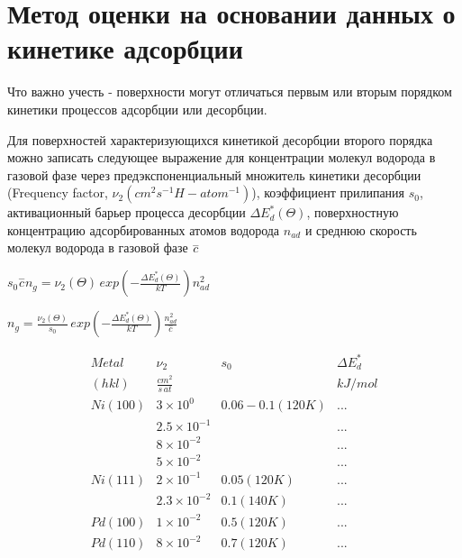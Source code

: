 \documentclass[11pt]{article}
\begin{document}
    

    \section{Метод оценки на основании данных о кинетике
адсорбции}\label{ux43cux435ux442ux43eux434-ux43eux446ux435ux43dux43aux438-ux43dux430-ux43eux441ux43dux43eux432ux430ux43dux438ux438-ux434ux430ux43dux43dux44bux445-ux43e-ux43aux438ux43dux435ux442ux438ux43aux435-ux430ux434ux441ux43eux440ux431ux446ux438ux438}

    Что важно учесть - поверхности могут отличаться первым или вторым
порядком кинетики процессов адсорбции или десорбции.

    Для поверхностей характеризующихся кинетикой десорбции второго порядка
можно записать следующее выражение для концентрации молекул водорода в
газовой фазе через предэкспоненциальный множитель кинетики десорбции
(Frequency factor, \(\nu_{2} (cm^{2} s^{-1} H-atom^{-1})\)), коэффициент
прилипания \(s_0\), активационный барьер процесса десорбции
\(\Delta E^{*}_{d}\left(\Theta\right)\), поверхностную концентрацию
адсорбированных атомов водорода \(n_{ad}\) и среднюю скорость молекул
водорода в газовой фазе \({\overset{-}c}\)

    \(s_0\overset{-}c n_g = \nu_2 \left(\Theta\right) \, exp \left(-\frac{\Delta E^{*}_{d} \left(\Theta\right)}{kT} \right) n_{ad}^2\)

    \(n_g = \frac{\nu_2 \left(\Theta\right)}{s_0} \, exp \left(-\frac{\Delta E^{*}_{d} \left(\Theta\right)}{kT} \right) \frac{n_{ad}^2}{\overset{-}c}\)

    \[\begin{array}{rrrr}
Metal      & \nu_{2}                &    s_0            & \Delta E^{*}_{d} \\
(hkl)      & \frac{cm^{2}}{s \, at} &                   &       kJ/mol     \\
Ni(100)    & 3 \times 10^{0}        & 0.06-0.1 (120 K)  & ...              \\
           & 2.5 \times 10^{-1}     &                   & ...              \\
           & 8 \times 10^{-2}       &                   & ...              \\
           & 5 \times 10^{-2}       &                   & ...              \\
Ni(111)    & 2 \times 10^{-1}       & 0.05 (120 K)      & ...              \\
           & 2.3 \times 10^{-2}     & 0.1  (140 K)      & ...              \\
Pd(100)    & 1 \times 10^{-2}       & 0.5  (120 K)      & ...              \\
Pd(110)    & 8 \times 10^{-2}       & 0.7  (120 K)      & ...              \\
\end{array}\]
\end{document}
